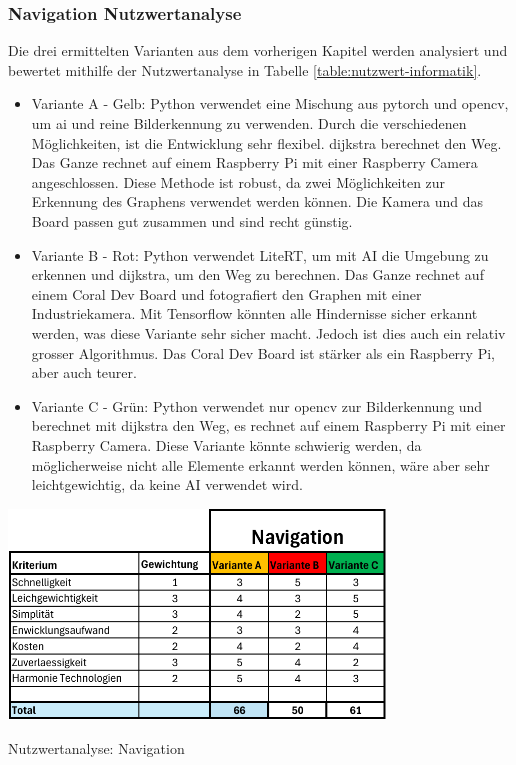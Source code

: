\subsubsection*{Navigation Nutzwertanalyse}

Die drei ermittelten Varianten aus dem vorherigen Kapitel werden analysiert und bewertet mithilfe der Nutzwertanalyse in Tabelle \ref{table:nutzwert-informatik}.

\begin{itemize}
     \item Variante A - Gelb: Python verwendet eine Mischung aus \gls{pytorch} und \gls{opencv}, um \acrshort{ai} und reine Bilderkennung zu verwenden. Durch die verschiedenen Möglichkeiten, ist die Entwicklung sehr flexibel. \gls{dijkstra} berechnet den Weg. Das Ganze rechnet auf einem Raspberry Pi mit einer Raspberry Camera angeschlossen. Diese Methode ist robust, da zwei Möglichkeiten zur Erkennung des Graphens verwendet werden können. Die Kamera und das Board passen gut zusammen und sind recht günstig. 
    \item  Variante B - Rot: Python verwendet LiteRT, um mit AI die Umgebung zu erkennen und \gls{dijkstra}, um den Weg zu berechnen. Das Ganze rechnet auf einem Coral Dev Board und fotografiert den Graphen mit einer Industriekamera. Mit Tensorflow könnten alle Hindernisse sicher erkannt werden, was diese Variante sehr sicher macht. Jedoch ist dies auch ein relativ grosser Algorithmus. Das Coral Dev Board ist stärker als ein Raspberry Pi, aber auch teurer.
    \item Variante C - Grün: Python verwendet nur \gls{opencv} zur Bilderkennung und berechnet mit \gls{dijkstra} den Weg, es rechnet auf einem Raspberry Pi mit einer Raspberry Camera. Diese Variante könnte schwierig werden, da möglicherweise nicht alle Elemente erkannt werden können, wäre aber sehr leichtgewichtig, da keine AI verwendet wird.
\end{itemize}


\begin{table}[H]
\centering
\includegraphics[width=0.75\textwidth]{assets/Nutzwertanalyse-I.pdf}
\caption{Nutzwertanalyse: Navigation}
\label{table:nutzwert-informatik}
\end{table}

